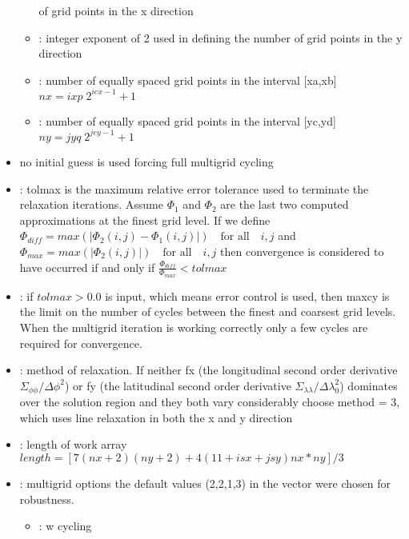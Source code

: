 \begin{itemize}
\begin{itemize}
    	    of grid points in the x direction 
    \item {}: integer exponent of 2 used in defining the number
    	    of grid points in the y direction 
    \item {}: number of equally spaced grid points in the interval [xa,xb]
    		$ nx = ixp \; 2^{iex-1} + 1$
    \item {}: number of equally spaced grid points in the interval [yc,yd]
    		$ ny = jyq \; 2^{jey-1} + 1$
  \end{itemize}
  \item {} no initial guess is used  forcing full multigrid cycling
  \item {}: 
        tolmax is the maximum relative error tolerance
	  used to terminate the relaxation iterations. Assume $\Phi_1$
	  and $\Phi_2$ are the last two computed approximations at 
	  the finest grid level. If we define \\
	     $ \Phi_{diff} = max(|\Phi_2(i,j)-\Phi_1(i,j)|) \quad \text{for all} \quad i,j$
	  and \\
	      $ \Phi_{max} = max(|\Phi_2(i,j)|) \quad \text{for all} \quad i,j $
	  then convergence is considered to have occurred if and only if
	      $ \frac{\Phi_{diff}}{\Phi_{max}} < tolmax  $
  \item {}: if $tolmax > 0.0$
	  is input, which means error control is used, then maxcy is the limit on the number
	  of cycles between the finest and coarsest grid levels. 
	  When the multigrid iteration is working
          correctly only a few cycles are required for convergence.
  \item {}: method of relaxation. If neither fx (the longitudinal
       second order derivative $\Sigma_{\phi \phi}/ \Delta \phi^2$) or fy (the latitudinal
       second order derivative $\Sigma_{\lambda \lambda}/ \Delta \lambda_0^2$) dominates 
       over the solution region and they
       both vary considerably choose method = 3, which uses line 
       relaxation in both the x and y direction
  \item {}: length of work array \\
        $length = [7(nx+2)(ny+2)+4(11+isx+jsy)nx*ny]/3$
  \item {}: multigrid options the default values 
     (2,2,1,3) in the vector  were chosen for
     robustness.
     \begin{itemize}
         \item {}: w cycling 

\end{itemize}
\end{itemize}
